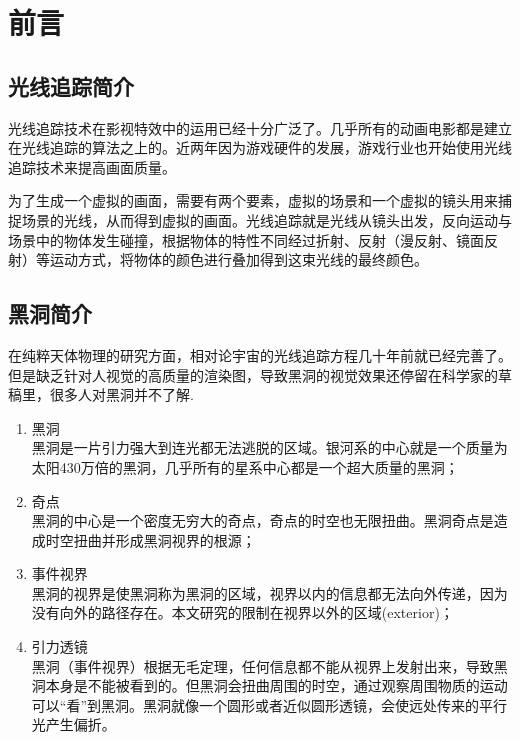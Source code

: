 %
%
%
%
%
%

\chapter{前言}

\section{光线追踪简介}
光线追踪技术在影视特效中的运用已经十分广泛了。几乎所有的动画电影都是建立在光线追踪的算法之上的。近两年因为游戏硬件的发展，游戏行业也开始使用光线追踪技术来提高画面质量。

为了生成一个虚拟的画面，需要有两个要素，虚拟的场景和一个虚拟的镜头用来捕捉场景的光线，从而得到虚拟的画面。光线追踪就是光线从镜头出发，反向运动与场景中的物体发生碰撞，根据物体的特性不同经过折射、反射（漫反射、镜面反射）等运动方式，将物体的颜色进行叠加得到这束光线的最终颜色。

\section{黑洞简介}
在纯粹天体物理的研究方面，相对论宇宙的光线追踪方程几十年前就已经完善了。但是缺乏针对人视觉的高质量的渲染图，导致黑洞的视觉效果还停留在科学家的草稿里，很多人对黑洞并不了解.
\begin{enumerate}
    \item 黑洞 \\ 黑洞是一片引力强大到连光都无法逃脱的区域\cite{what_is_black_hole}。银河系的中心就是一个质量为太阳430万倍的黑洞\cite{galactic_center_bh}，几乎所有的星系中心都是一个超大质量的黑洞；
    \item 奇点 \\ 黑洞的中心是一个密度无穷大的奇点，奇点的时空也无限扭曲。黑洞奇点是造成时空扭曲并形成黑洞视界的根源；
    \item 事件视界 \\ 黑洞的视界是使黑洞称为黑洞的区域，视界以内的信息都无法向外传递，因为没有向外的路径存在。本文研究的限制在视界以外的区域(exterior)；
    \item 引力透镜 \\ 黑洞（事件视界）根据无毛定理，任何信息都不能从视界上发射出来，导致黑洞本身是不能被看到的。但黑洞会扭曲周围的时空，通过观察周围物质的运动可以“看”到黑洞。黑洞就像一个圆形或者近似圆形透镜，会使远处传来的平行光产生偏折。
\end{enumerate}

